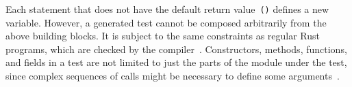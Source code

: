 \documentclass{article}
\begin{document}

Each statement that does not have the default return value~\lstinline{()} defines a new variable. However, a generated test cannot be composed arbitrarily from the above building blocks. It is subject to the same constraints as regular Rust programs, which are checked by the compiler~\cite{Tonella2004}. Constructors, methods, functions, and fields in a test are not limited to just the parts of the module under the test, since complex sequences of calls might be necessary to define some arguments~\cite{Fraser2012}. 

\end{document}
